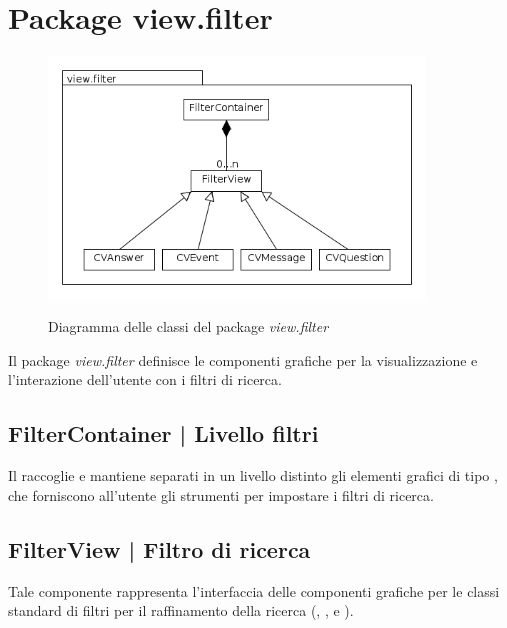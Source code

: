 \documentclass[10pt,a4paper,headinclude,footinclude,hidelinks]{scrreprt} %
\begin{document}
	\section{Package view.filter}
	\label{sec:stage:design:view.filter}

	\begin{figure}[ht]
		\begin{center}
	    	\includegraphics[width=10cm]{class/view_filter.png}
			\label{gfx:class:view:filter}
			\caption{Diagramma delle classi del package \textit{view.filter}}
		\end{center}
	\end{figure}

	Il package \textit{view.filter} definisce le componenti grafiche per la visualizzazione e l'interazione dell'utente con i filtri di ricerca.

	\subsection[FilterContainer]{FilterContainer | Livello filtri}
	\label{sec:stage:design:view.filter:filter-container}
	Il \textit{} raccoglie e mantiene separati in un livello distinto gli elementi grafici di tipo \textit{}, che forniscono all'utente gli strumenti per impostare i filtri di ricerca.

	\subsection[FilterView]{FilterView | Filtro di ricerca}
	\label{sec:stage:design:view.filter:filter}
	Tale componente rappresenta l'interfaccia delle componenti grafiche per le classi standard di filtri per il raffinamento della ricerca (\textit{}, \textit{}, \textit{} e \textit{}).
\end{document}
